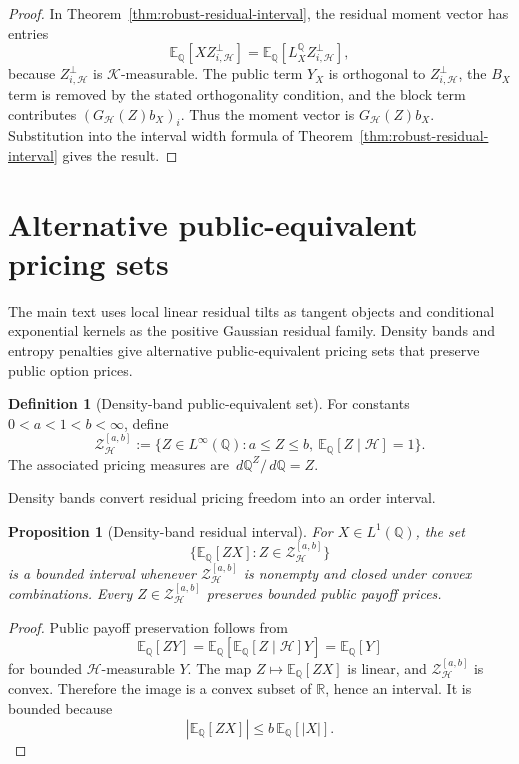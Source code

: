 \documentclass[11pt,a4paper]{amsart}
\theoremstyle{plain}
\newtheorem{proposition}[theorem]{Proposition}
\theoremstyle{definition}
\newtheorem{definition}[theorem]{Definition}
\theoremstyle{remark}
\newcommand{\R}{\mathbb{R}}
\newcommand{\QQ}{\mathbb{Q}}
\newcommand{\EE}{\mathbb{E}}
\newcommand{\cH}{\mathcal{H}}
\newcommand{\cK}{\mathcal{K}}
\newcommand{\cZ}{\mathcal{Z}}
\newcommand{\dd}{\,d}
\begin{document}
\begin{proof}
In Theorem~\ref{thm:robust-residual-interval}, the residual moment vector has entries
\[
        \EE_\QQ[XZ_{i,\cH}^{\perp}]
        =
        \EE_\QQ[L_X^\QQ Z_{i,\cH}^{\perp}],
\]
because \(Z_{i,\cH}^{\perp}\) is \(\cK\)-measurable.  The public term \(Y_X\) is orthogonal to
\(Z_{i,\cH}^{\perp}\), the \(B_X\) term is removed by the stated orthogonality condition, and
the block term contributes \( (G_{\cH}(Z)b_X)_i\).  Thus the moment vector is
\(G_{\cH}(Z)b_X\).  Substitution into the interval width formula of
Theorem~\ref{thm:robust-residual-interval} gives the result.
\end{proof}

\section{Alternative public-equivalent pricing sets}\label{app:robust}

The main text uses local linear residual tilts as tangent objects and conditional exponential
kernels as the positive Gaussian residual family.  Density bands and entropy penalties give
alternative public-equivalent pricing sets that preserve public option prices.

\begin{definition}[Density-band public-equivalent set]\label{def:density-band}
For constants \(0<a<1<b<\infty\), define
\[
        \cZ_{\cH}^{[a,b]}
        :=
        \{Z\in L^\infty(\QQ):a\le Z\le b,\ \EE_\QQ[Z\mid\cH]=1\}.
\]
The associated pricing measures are \(\dd\QQ^Z/\dd\QQ=Z\).
\end{definition}

Density bands convert residual pricing freedom into an order interval.

\begin{proposition}[Density-band residual interval]\label{prop:density-band-interval}
For \(X\in L^1(\QQ)\), the set
\[
        \{\EE_\QQ[ZX]:Z\in\cZ_{\cH}^{[a,b]}\}
\]
is a bounded interval whenever \(\cZ_{\cH}^{[a,b]}\) is nonempty and closed under convex
combinations.  Every \(Z\in\cZ_{\cH}^{[a,b]}\) preserves bounded public payoff prices.
\end{proposition}

\begin{proof}
Public payoff preservation follows from
\[
        \EE_\QQ[ZY]
        =
        \EE_\QQ[\EE_\QQ[Z\mid\cH]Y]
        =
        \EE_\QQ[Y]
\]
for bounded \(\cH\)-measurable \(Y\).  The map \(Z\mapsto \EE_\QQ[ZX]\) is linear, and
\(\cZ_{\cH}^{[a,b]}\) is convex.  Therefore the image is a convex subset of \(\R\), hence an
interval.  It is bounded because
\[
        |\EE_\QQ[ZX]|\le b\,\EE_\QQ[|X|].
\]
\end{proof}
\end{document}
